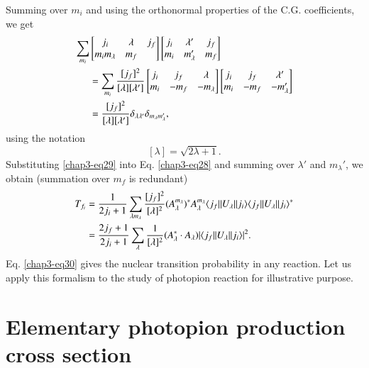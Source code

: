 Summing over $m_i$ and using the orthonormal properties of the C.G. coefficients, we get
\begin{align}
  \sum_{m_i} &
  \begin{bmatrix} j_i & \lambda & j_f\\ m_i m_\lambda & m_f  \end{bmatrix}
  \begin{bmatrix} j_i & \lambda' & j_f \\ m_i & m_\lambda' & m_f\end{bmatrix} \notag \\
    & = \sum_{m_i} \frac{[j_f]^2}{[\lambda][\lambda']}
      \begin{bmatrix} j_i &  j_f  & \lambda \\ m_i &  -m_f & -m_\lambda\end{bmatrix}
      \begin{bmatrix} j_i &  j_f  & \lambda' \\ m_i &  -m_f & -m_\lambda'\end{bmatrix} \notag \\
    & = \frac{[j_f]^2}{[\lambda][\lambda']} \delta_{\lambda \lambda'} \delta_{m_\lambda m_\lambda'}, \label{chap3-eq29}    
\end{align}
using the notation
$$
[\lambda] = \sqrt{2 \lambda +1}.
$$
Substituting \eqref{chap3-eq29} into Eq. \eqref{chap3-eq28} and summing over $\lambda'$ and $m_\lambda'$, we obtain (summation over $m_f$ is redundant)
\begin{align}
  T_{f_i} & = \frac{1}{2j_i +1} \sum_{\lambda m_\lambda} \frac{[j_f]^2}{[\lambda]^2} (A_\lambda^{m_\lambda})^\ast A_\lambda^{m_\lambda} \langle j_f || U_\lambda || j_i \rangle \langle j_f || U_\lambda || j_i \rangle^\ast \notag \\
  & = \frac{2j_f+1}{2j_i+1} \sum_{\lambda} \frac{1}{[\lambda]^2} (A_\lambda^\ast \cdot A_\lambda)| \langle j_f || U_\lambda || j_i \rangle |^2. \label{chap3-eq30}
\end{align}
Eq. \eqref{chap3-eq30} gives the nuclear transition probability in any reaction. Let us apply this formalism to the study of photopion reaction for illustrative purpose.

\section{Elementary photopion production cross section}\label{chap3-sec4}


